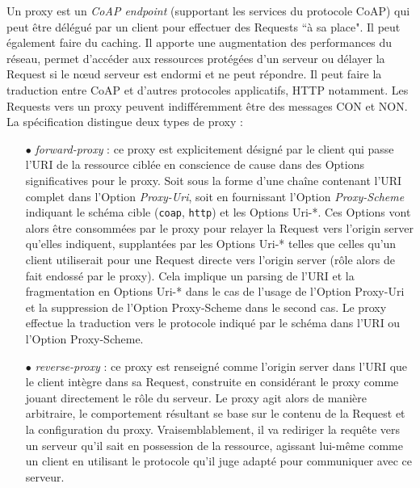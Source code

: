 \documentclass[]{report}
\begin{document}
\par Un proxy est un \textit{CoAP endpoint} (supportant les services du protocole CoAP) qui peut être délégué par un client pour effectuer des Requests ``à sa place". Il peut également faire du caching. Il apporte une augmentation des performances du réseau, permet d'accéder aux ressources protégées d'un serveur ou délayer la Request si le nœud serveur est endormi et ne peut répondre. Il peut faire la traduction entre CoAP et d'autres protocoles applicatifs, HTTP notamment. Les Requests vers un proxy peuvent indifféremment être des messages CON et NON. La spécification \cite{rfc7252} distingue deux types de proxy :
\vspace{0.2cm}
\begin{itemize}
\item[$\bullet$] \textit{forward-proxy} : ce proxy est explicitement désigné par le client qui passe l'URI de la ressource ciblée en conscience de cause dans des Options significatives pour le proxy. Soit sous la forme d'une chaîne contenant l'URI complet dans l'Option \textit{Proxy-Uri}, soit en fournissant l'Option \textit{Proxy-Scheme} indiquant le schéma cible (\texttt{coap}, \texttt{http}) et les Options Uri-*. Ces Options vont alors être consommées par le proxy pour relayer la Request vers l'origin server qu'elles indiquent, supplantées par les Options Uri-* telles que celles qu'un client utiliserait pour une Request directe vers l'origin server (rôle alors de fait endossé par le proxy). Cela implique un parsing de l'URI et la fragmentation en Options Uri-* dans le cas de l'usage de l'Option Proxy-Uri et la suppression de l'Option Proxy-Scheme dans le second cas. Le proxy effectue la traduction vers le protocole indiqué par le schéma dans l'URI ou l'Option Proxy-Scheme.
\vspace{0.2cm}
\item[$\bullet$] \textit{reverse-proxy} : ce proxy est renseigné comme l'origin server dans l'URI que le client intègre dans sa Request, construite en considérant le proxy comme jouant directement le rôle du serveur. Le proxy agit alors de manière arbitraire, le comportement résultant se base sur le contenu de la Request et la configuration du proxy. Vraisemblablement, il va rediriger la requête vers un serveur qu'il sait en possession de la ressource, agissant lui-même comme un client en utilisant le protocole qu'il juge adapté pour communiquer avec ce serveur.
\end{itemize}
 
\newpage
\end{document}

